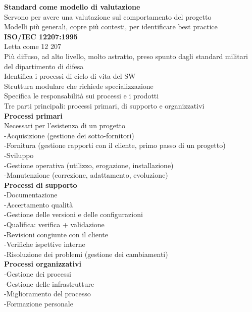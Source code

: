 \documentclass{article}
\begin{document}
		\textbf{Standard come modello di valutazione}\\
		Servono per avere una valutazione sul comportamento del progetto\\
		Modelli più generali, copre più contesti, per identificare best practice\\
	
		\textbf{ISO/IEC 12207:1995}\\
		Letta come 12 207\\
		Più diffuso, ad alto livello, molto astratto, preso spunto dagli standard militari del dipartimento di difesa\\
		Identifica i processi di ciclo di vita del SW\\
		Struttura modulare che richiede specializzazione\\
		Specifica le responsabilità sui processi e i prodotti\\
		Tre parti principali: processi primari, di supporto e organizzativi\\
	
		\textbf{Processi primari}\\
		Necessari per l'esistenza di un progetto\\
		-Acquisizione (gestione dei sotto-fornitori)\\
		-Fornitura (gestione rapporti con il cliente, primo passo di un progetto)\\
		-Sviluppo\\
		-Gestione operativa (utilizzo, erogazione, installazione)\\
		-Manutenzione (correzione, adattamento, evoluzione)\\
		
		\textbf{Processi di supporto}\\
		-Documentazione\\
		-Accertamento qualità\\
		-Gestione delle versioni e delle configurazioni\\
		-Qualifica: verifica + validazione\\
		-Revisioni congiunte con il cliente\\
		-Verifiche ispettive interne\\
		-Risoluzione dei problemi (gestione dei cambiamenti)\\
		
		\textbf{Processi organizzativi}\\
		-Gestione dei processi\\
		-Gestione delle infrastrutture\\
		-Miglioramento del processo\\
		-Formazione personale\\
		
\end{document}
